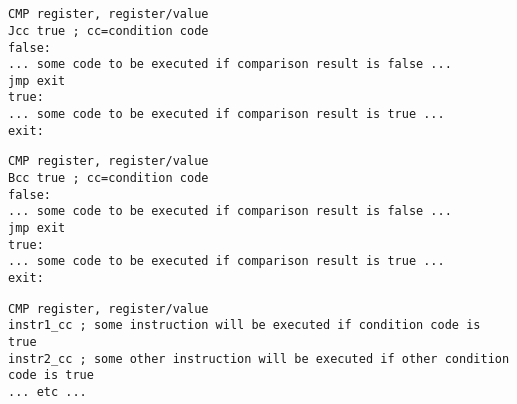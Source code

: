 \chapter{}
\label{sec:Jcc}



\section{}

\begin{lstlisting}[caption=x86]
CMP register, register/value
Jcc true ; cc=condition code
false:
... some code to be executed if comparison result is false ...
jmp exit 
true:
... some code to be executed if comparison result is true ...
exit:
\end{lstlisting}

\begin{lstlisting}[caption=ARM]
CMP register, register/value
Bcc true ; cc=condition code
false:
... some code to be executed if comparison result is false ...
jmp exit 
true:
... some code to be executed if comparison result is true ...
exit:
\end{lstlisting}


\begin{lstlisting}[caption=ARM]
CMP register, register/value
instr1_cc ; some instruction will be executed if condition code is true
instr2_cc ; some other instruction will be executed if other condition code is true
... etc ...
\end{lstlisting}

